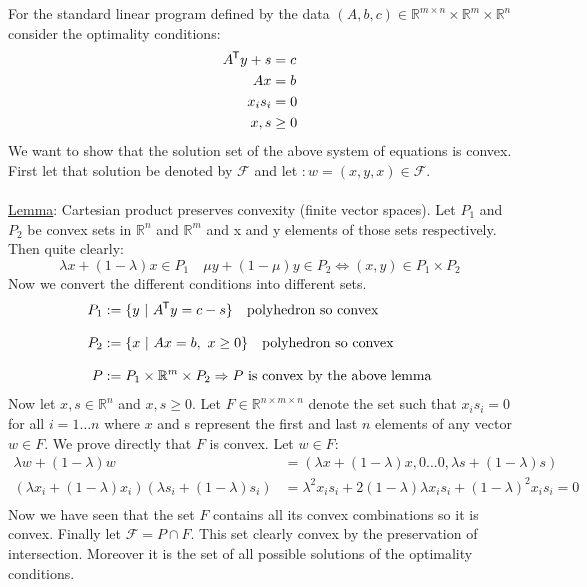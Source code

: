 \documentclass{article}
\newcommand*{\tran}{^{\mkern-1.5mu\mathsf{T}}}%
\begin{document}
	For the standard linear program defined by the data $(A,b,c) \in \mathbb R^{m\times n} \times \mathbb R^m \times \mathbb R^n$ consider the optimality conditions:
	\begin{align*}
		A\tran y + s &= c\\
		Ax &= b\\
		x_i s_i & =0\\
		x,s &\geq 0
	\end{align*}
	We want to show that the solution set of the above system of equations is convex. First let that solution be denoted by $\mathcal F$ and let $:w = (x,y,x) \in \mathcal F$. \\ \\
	\underline{Lemma}: Cartesian product preserves convexity (finite vector spaces). Let $P_1$ and $P_2$ be convex sets in $\mathbb R^n$ and $\mathbb R^m$ and x and y elements of those sets respectively. Then quite clearly:
	\begin{equation}
		\lambda x + (1-\lambda)x \in P_1 \quad \mu y + (1-\mu)y\in P_2 \iff (x,y) \in P_1 \times P_2
	\end{equation}
	Now we convert the different conditions into different sets.
	\begin{align*}
		P_1 &:= \{ y \ \vert \ A\tran y = c-s\}   \quad \text{polyhedron so convex} \\[2ex]
		P_2 &:= \{ x \ \vert \ Ax =b, \ x\geq 0 \}  \quad \text{polyhedron so convex}\\[2ex]
		P &:=  P_1 \times \mathbb R^m \times P_2 \Rightarrow P \text{ is convex by the above lemma}
	\end{align*} 
	Now let $x,s\in \mathbb R^n$ and $x,s \geq 0$. Let $F \in \mathbb R^{n\times m\times  n}$ denote the set such that $x_i s_i = 0$ for all $i = 1 \ldots n$ where $x$ and s represent the first and last $n$ elements of any vector $w\in F$. We prove directly that $F$ is convex. Let $w \in F$:
	\begin{align*}
		\lambda w + (1-\lambda)w &= (\lambda x + (1-\lambda)x,0\ldots0,\lambda s + (1-\lambda)s)\\
		(\lambda x_i + (1-\lambda)x_i)(\lambda s_i + (1-\lambda)s_i) &= 
		\lambda^2 x_i s_i + 2(1-\lambda)\lambda x_i s_i + (1-\lambda)^2x_i s_i = 0\\
	\end{align*}
	Now we have seen that the set $F$ contains all its convex combinations so it is convex. Finally let $\mathcal F = P \cap F$. This set clearly convex by the preservation of intersection. Moreover it is the set of all possible solutions of the optimality conditions. 
	
\end{document}
